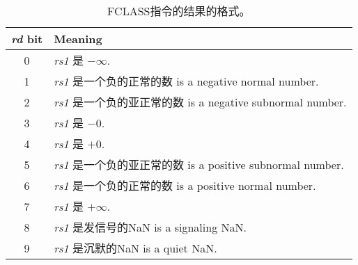 \begin{table}[htp]
\begin{small}
\begin{center}
\begin{tabular}{|c|l|}
\hline
{\em rd} bit &
Meaning \\
\hline
0 & {\em rs1} 是 $-\infty$. \\
1 & {\em rs1} 是一个负的正常的数  is a negative normal number. \\
2 & {\em rs1} 是一个负的亚正常的数 is a negative subnormal number. \\
3 & {\em rs1} 是 $-0$. \\
4 & {\em rs1} 是 $+0$. \\
5 & {\em rs1} 是一个负的亚正常的数  is a positive subnormal number. \\
6 & {\em rs1} 是一个负的正常的数  is a positive normal number. \\
7 & {\em rs1} 是 $+\infty$. \\
8 & {\em rs1} 是发信号的NaN  is a signaling NaN. \\
9 & {\em rs1} 是沉默的NaN  is a quiet NaN. \\
\hline
\end{tabular}
\end{center}
\end{small}
\caption{FCLASS指令的结果的格式。
}
\label{tab:fclass}
\end{table}
